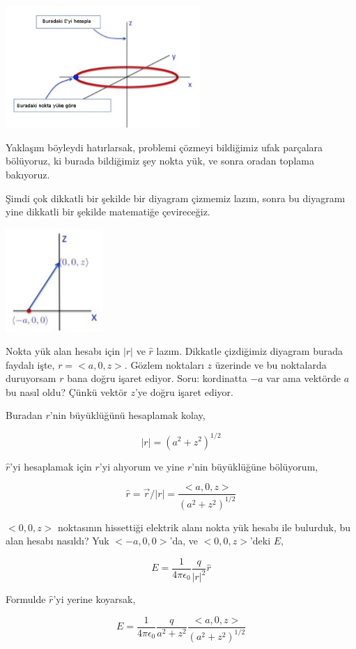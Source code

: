 \documentclass[12pt,fleqn]{article}\usepackage{../../common}
\begin{document}
\includegraphics[width=20em]{06_03.jpg}

Yaklaşım böyleydi hatırlarsak, problemi çözmeyi bildiğimiz ufak parçalara
bölüyoruz, ki burada bildiğimiz şey nokta yük, ve sonra oradan toplama
bakıyoruz.

Şimdi çok dikkatli bir şekilde bir diyagram çizmemiz lazım, sonra bu diyagramı
yine dikkatli bir şekilde matematiğe çevireceğiz. 

\includegraphics[width=10em]{06_04.jpg}

Nokta yük alan hesabı için $|r|$ ve $\hat{r}$ lazım. Dikkatle çizdiğimiz
diyagram burada faydalı işte, $r = <a,0,z>$. Gözlem noktaları $z$ üzerinde ve
bu noktalarda duruyorsam $r$ bana doğru işaret ediyor. Soru: kordinatta $-a$ var
ama vektörde $a$ bu nasıl oldu? Çünkü vektör $z$'ye doğru işaret ediyor.

Buradan $r$'nin büyüklüğünü hesaplamak kolay,

$$ |r| = (a^2 + z^2)^{1/2}$$

$\hat{r}$'yi hesaplamak için $r$'yi alıyorum ve yine $r$'nin büyüklüğüne
bölüyorum,

$$
\hat{r} = \vec{r} / |r|  = \frac{ < a,0,z > }{(a^2 + z^2)^{1/2}}
$$

$<0,0,z>$ noktasının hissettiği elektrik alanı nokta yük hesabı ile bulurduk, bu
alan hesabı nasıldı? Yuk $<-a,0,0>$'da, ve $<0,0,z>$'deki $E$,

$$
E = \frac{1}{4\pi\epsilon_0 } \frac{q}{|r|^2}\hat{r}
$$

Formulde $\hat{r}$'yi yerine koyarsak,

$$
E = \frac{1}{4\pi\epsilon_0 } \frac{q}{a^2 + z^2}
    \frac{< a,0,z >}{(a^2 + z^2)^{1/2}}
$$
\end{document}
